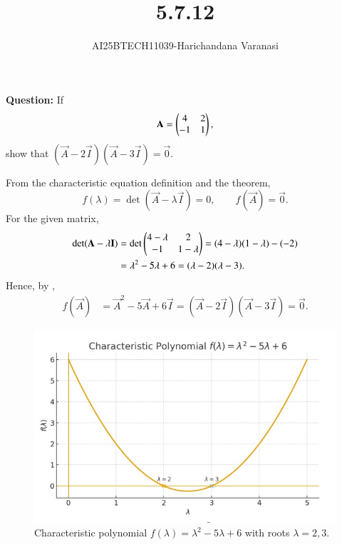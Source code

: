 \documentclass[journal]{IEEEtran}
\title{5.7.12}
\author{AI25BTECH11039-Harichandana Varanasi}
\date{}
\numberwithin{equation}{enumi}
\numberwithin{figure}{enumi}
\begin{document}
\maketitle


\textbf{Question:}
If 
\[
\mathbf{A}=\begin{pmatrix}4 & 2\\ -1 & 1\end{pmatrix},
\]
show that $(\vec{A}-2\vec{I})(\vec{A}-3\vec{I})=\vec{0}$.


\begin{solution}
\renewcommand\theequation{\arabic{equation}}
\setcounter{equation}{0}

From the characteristic equation definition and the  theorem,
\[
f(\lambda)=\det(\vec{A}-\lambda\vec{I})=0,\qquad f(\vec{A})=\vec{0}.
\]
For the given matrix,
\begin{align}
\det(\mathbf{A}-\lambda\mathbf{I})
&=\det\begin{pmatrix}4-\lambda & 2\\ -1 & 1-\lambda\end{pmatrix}
=(4-\lambda)(1-\lambda)-(-2) \nonumber\\
&=\lambda^2-5\lambda+6
=(\lambda-2)(\lambda-3).
\label{eq:char}
\end{align}
Hence, by  ,
\begin{align}
f(\vec{A})
&=\vec{A}^2-5\vec{A}+6\vec{I}
=(\vec{A}-2\vec{I})(\vec{A}-3\vec{I})
=\vec{0}.
\label{eq:CH}
\end{align}

\end{solution}


                     
\begin{figure}[H]
  \centering
  \includegraphics[width=0.8\linewidth]{figs/matgeo-5.7.12.jpeg}
  \caption{Characteristic polynomial $f(\lambda)=\lambda^2-5\lambda+6$ with roots $\lambda=2,3$.}
\label{fig:charpoly-A}
\end{figure}

 
\end{document}
